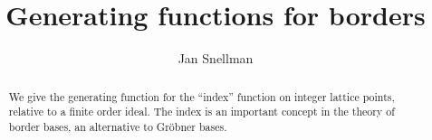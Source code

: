 \documentclass[reqno,a4paper,10pt]{amsart}
\theoremstyle{definition}
\theoremstyle{remark}
\theoremstyle{plain}
\begin{document}
\title{Generating functions for borders}
\author{Jan Snellman}
\address{Department of Mathematics, Link\"oping University\\
SE 58183 Link\"oping, Sweden}



\begin{abstract}
  We give the generating function for the ``index'' function on integer lattice
  points, relative to a finite order ideal. The index is an important
  concept in the theory of border bases, an alternative to Gr\"obner
  bases. 
\end{abstract}

\maketitle
\end{document}
